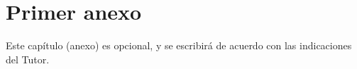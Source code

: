 \chapter*{Primer anexo}
Este capítulo (anexo) es opcional, y se escribirá de acuerdo con las indicaciones del Tutor.
